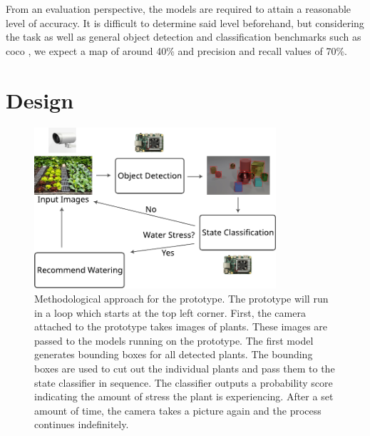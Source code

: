 \documentclass[draft,final]{vutinfth} %
\begin{document}
From an evaluation perspective, the models are required to attain a
reasonable level of accuracy. It is difficult to determine said level
beforehand, but considering the task as well as general object
detection and classification benchmarks such as \gls{coco}
\cite{lin2015}, we expect a \gls{map} of around 40\% and precision and
recall values of 70\%.

\section{Design}
\label{sec:design}

\begin{figure}
  \centering
  \includegraphics[width=0.8\textwidth]{graphics/setup.pdf}
  \caption[Methodological approach for the prototype.]{Methodological
    approach for the prototype. The prototype will run in a loop which
    starts at the top left corner. First, the camera attached to the
    prototype takes images of plants. These images are passed to the
    models running on the prototype. The first model generates
    bounding boxes for all detected plants. The bounding boxes are
    used to cut out the individual plants and pass them to the state
    classifier in sequence. The classifier outputs a probability score
    indicating the amount of stress the plant is experiencing. After a
    set amount of time, the camera takes a picture again and the
    process continues indefinitely.}
  \label{fig:setup}
\end{figure}
\end{document}
